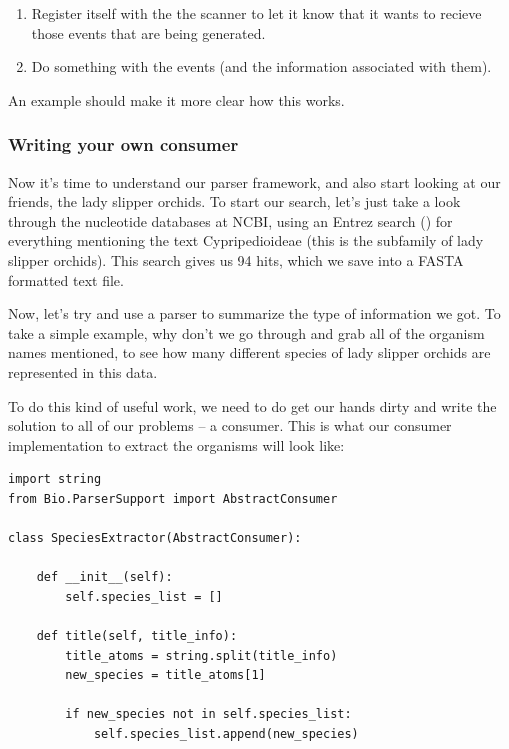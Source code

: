 \documentclass{article}
\begin{document}
\begin{enumerate}

\item Register itself with the the scanner to let it know that it wants to recieve those events that are being generated.

\item Do something with the events (and the information associated with them).

\end{enumerate}

An example should make it more clear how this works.

\subsubsection{Writing your own consumer}

Now it's time to understand our parser framework, and also start looking at our friends, the lady slipper orchids. To start our search, let's just take a look through the nucleotide databases at NCBI, using an Entrez search () for everything mentioning the text Cypripedioideae (this is the subfamily of lady slipper orchids). This search gives us 94 hits, which we save into a FASTA formatted text file.


Now, let's try and use a parser to summarize the type of information we got. To take a simple example, why don't we go through and grab all of the organism names mentioned, to see how many different species of lady slipper orchids are represented in this data.


To do this kind of useful work, we need to do get our hands dirty and write the solution to all of our problems -- a consumer. This is what our consumer implementation to extract the organisms will look like:

\begin{verbatim}
import string
from Bio.ParserSupport import AbstractConsumer

class SpeciesExtractor(AbstractConsumer):

    def __init__(self):
        self.species_list = []

    def title(self, title_info):
        title_atoms = string.split(title_info)
        new_species = title_atoms[1]

        if new_species not in self.species_list:
            self.species_list.append(new_species)
\end{verbatim}
\end{document}
